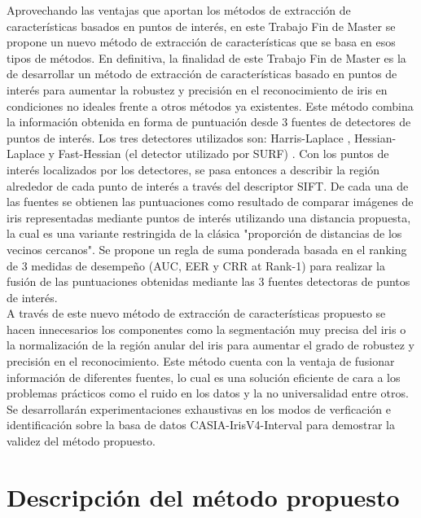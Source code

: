 Aprovechando las ventajas que aportan los métodos de extracción de características basados en puntos de interés, en este Trabajo Fin de Master se propone un nuevo método de extracción de características que se basa en esos tipos de métodos. En definitiva, la finalidad de este Trabajo Fin de Master es la de desarrollar un método de extracción de características basado en puntos de interés para aumentar la robustez y precisión en el reconocimiento de iris en condiciones no ideales frente a otros métodos ya existentes. Este método combina la información obtenida en forma de puntuación desde 3 fuentes de detectores de puntos de interés. Los tres detectores utilizados son: Harris-Laplace \cite{Reference20}, Hessian-Laplace \cite{Reference20} y Fast-Hessian (el detector utilizado por SURF) \cite{Reference21}. Con los puntos de interés localizados por los detectores, se pasa entonces a describir la región alrededor de cada punto de interés a través del descriptor SIFT. De cada una de las fuentes se obtienen las puntuaciones como resultado de comparar imágenes de iris representadas mediante puntos de interés utilizando una distancia propuesta, la cual es una variante restringida de la clásica "proporción de distancias de los vecinos cercanos". Se propone un regla de suma ponderada basada en el ranking de 3 medidas de desempeño (AUC, EER y CRR at Rank-1) para realizar la fusión de las puntuaciones obtenidas mediante las 3 fuentes detectoras de puntos de interés. \\

A través de este nuevo método de extracción de características propuesto se hacen innecesarios los componentes como la segmentación muy precisa del iris o la normalización de la región anular del iris para aumentar el grado de robustez y precisión en el reconocimiento. Este método cuenta con la ventaja de fusionar información de diferentes fuentes, lo cual es una solución eficiente de cara a los problemas prácticos como el ruido en los datos y la no universalidad entre otros. Se desarrollarán experimentaciones exhaustivas en los modos de verficación e identificación sobre la basa de datos CASIA-IrisV4-Interval para demostrar la validez del método propuesto. \\



\section{Descripción del método propuesto}

